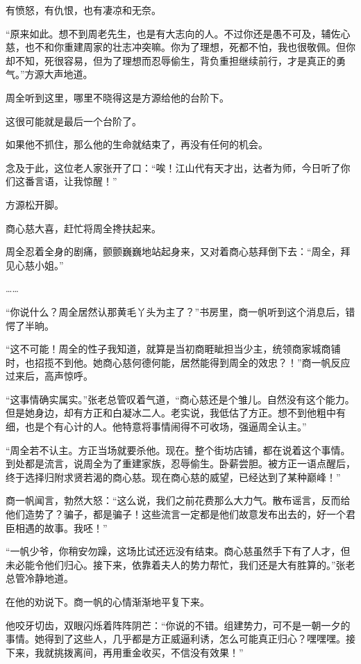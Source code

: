 \begin{this_body}
有愤怒，有仇恨，也有凄凉和无奈。

“原来如此。想不到周老先生，也是有大志向的人。不过你还是愚不可及，辅佐心慈，也不和你重建周家的壮志冲突嘛。你为了理想，死都不怕，我也很敬佩。但你却不知，死很容易，但为了理想而忍辱偷生，背负重担继续前行，才是真正的勇气。”方源大声地道。

周全听到这里，哪里不晓得这是方源给他的台阶下。

这很可能就是最后一个台阶了。

如果他不抓住，那么他的生命就结束了，再没有任何的机会。

念及于此，这位老人家张开了口：“唉！江山代有天才出，达者为师，今日听了你们这番言语，让我惊醒！”

方源松开脚。

商心慈大喜，赶忙将周全搀扶起来。

周全忍着全身的剧痛，颤颤巍巍地站起身来，又对着商心慈拜倒下去：“周全，拜见心慈小姐。”

……

“你说什么？周全居然认那黄毛丫头为主了？”书房里，商一帆听到这个消息后，错愕了半晌。

“这不可能！周全的性子我知道，就算是当初商睚眦担当少主，统领商家城商铺时，也招揽不到他。她商心慈何德何能，居然能得到周全的效忠？！”商一帆反应过来后，高声惊呼。

“这事情确实属实。”张老总管叹着气道，“商心慈还是个雏儿。自然没有这个能力。但是她身边，却有方正和白凝冰二人。老实说，我低估了方正。想不到他粗中有细，也是个有心计的人。他特意将事情闹得不可收场，强逼周全认主。”

“周全若不认主。方正当场就要杀他。现在。整个街坊店铺，都在说着这个事情。到处都是流言，说周全为了重建家族，忍辱偷生。卧薪尝胆。被方正一语点醒后，终于选择归附求贤若渴的商心慈。现在商心慈的威望，已经达到了某种巅峰！”

商一帆闻言，勃然大怒：“这么说，我们之前花费那么大力气。散布谣言，反而给他们造势了？骗子，都是骗子！这些流言一定都是他们故意发布出去的，好一个君臣相遇的故事。我呸！”

“一帆少爷，你稍安勿躁，这场比试还远没有结束。商心慈虽然手下有了人才，但未必能令他们归心。接下来，依靠着夫人的势力帮忙，我们还是大有胜算的。”张老总管冷静地道。

在他的劝说下。商一帆的心情渐渐地平复下来。

他咬牙切齿，双眼闪烁着阵阵阴芒：“你说的不错。组建势力，可不是一朝一夕的事情。她得到了这些人，几乎都是方正威逼利诱，怎么可能真正归心？嘿嘿嘿。接下来，我就挑拨离间，再用重金收买，不信没有效果！”


\end{this_body}
